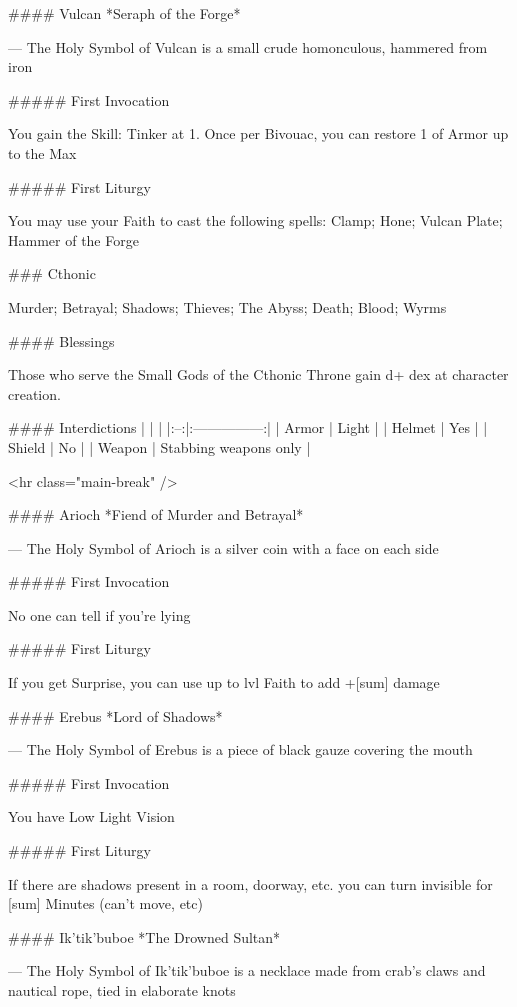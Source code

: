 #### Vulcan
*Seraph of the Forge*

---
The Holy Symbol of Vulcan is a small crude homonculous, hammered from iron

##### First Invocation

You gain the Skill: Tinker at 1.  Once per Bivouac, you can restore 1 \UD of Armor up to the Max 

##### First Liturgy

You may use your Faith to cast the following spells: Clamp; Hone; Vulcan Plate; Hammer of the Forge



### Cthonic



Murder; Betrayal; Shadows; Thieves; The Abyss; Death; Blood; Wyrms



#### Blessings

Those who serve the Small Gods of the Cthonic Throne gain {d+} {dex} at character creation.

#### Interdictions
| | |
|:--:|:---------------:|
| Armor | Light |
| Helmet | Yes |
| Shield | No |
| Weapon | Stabbing weapons only |

<hr class="main-break" />

#### Arioch
*Fiend of Murder and Betrayal*

---
The Holy Symbol of Arioch is a silver coin with a face on each side

##### First Invocation

No one can tell if you're lying

##### First Liturgy

If you get Surprise, you can use up to {lvl} Faith to add +[sum] damage





#### Erebus
*Lord of Shadows*

---
The Holy Symbol of Erebus is a piece of black gauze covering the mouth

##### First Invocation

You have Low Light Vision

##### First Liturgy

If there are shadows present in a room, doorway, etc. you can turn invisible for [sum] Minutes (can't move, etc)




#### Ik'tik'buboe
*The Drowned Sultan*

---
The Holy Symbol of Ik'tik'buboe is a necklace made from crab's claws and nautical rope, tied in elaborate knots

